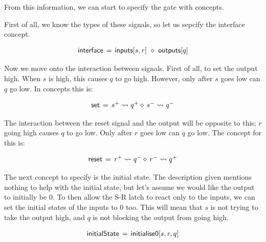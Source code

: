 \documentclass[british,conference,compsoc]{IEEEtran}
\begin{document}
\noindent From this information, we can start to specify the gate with concepts.

First of all, we know the types of these signals, so let us sepcify the interface concept.


\[
\begin{array}{lcl}
\mathsf{interface}&\hspace{-2mm}=&\hspace{-2mm}\mathsf{inputs}[s, r]~\diamond~\mathsf{outputs}[q]
\end{array}
\]

\noindent Now we move onto the interaction between signals. First of all, to set the output high.
When $s$ is high, this causes $q$ to go high. However, only after $s$ goes low can $q$ go low.
In concepts this is: 


\[
\begin{array}{lcl}
\mathsf{set}&\hspace{-2mm}=&\hspace{-2mm}s^{+} \rightsquigarrow q^{+} \diamond\, s^{-} \rightsquigarrow q^{-}
\end{array}
\]

\noindent The interaction between the reset signal and the output will be opposite to this; $r$ going high causes $q$ 
to go low. Only after $r$ goes low can $q$ go low. The concept for this is:

\[
\begin{array}{lcl}
\mathsf{reset}&\hspace{-2mm}=&\hspace{-2mm}r^{+} \rightsquigarrow q^{-} \diamond\, r^{-} \rightsquigarrow q^{+}
\end{array}
\]

\noindent The next concept to specify is the initial state. The description given mentions nothing
to help with the initial state, but let's assume we would like the output to initially be 0. 
To then allow the S-R latch to react only to the inputs, we can set the initial states of the 
inputs to 0 too. This will mean that $s$ is not trying to take the output high, and $q$ is not
blocking the output from going high. 

\[
\begin{array}{lcl}
\mathsf{initialState}&\hspace{-2mm}=&\hspace{-2mm}\mathsf{initialise0} [s, r, q]
\end{array}
\]
\end{document}
